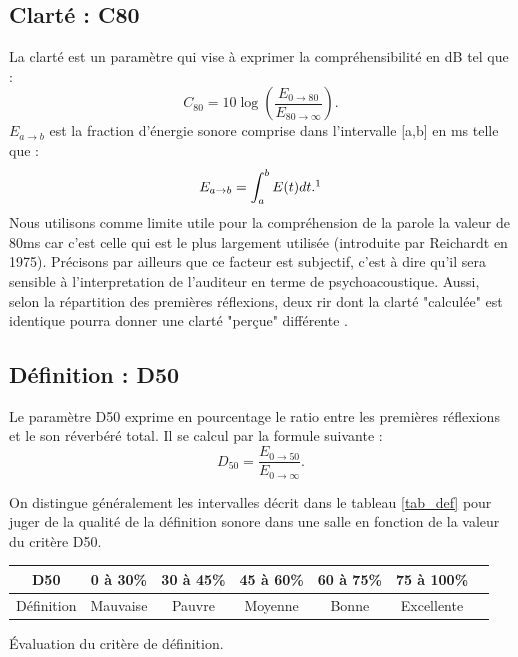 \subsection{Clarté : \gls{C80}}
La clarté est un paramètre qui vise à exprimer la compréhensibilité en dB tel que :
%
\begin{equation}
C_{80} = 10\log{\left( \frac{E_{0\to80}}{E_{80\to\infty}} \right)}.
\end{equation}
%
$E_{a\to b}$ est la fraction d'énergie sonore comprise dans l'intervalle [a,b] en ms telle que :
%
\begin{equation}
E_{a\to b} = \int_a^b E(t) dt. \footnotemark
\end{equation}
Nous utilisons comme limite utile pour la compréhension de la parole la valeur de 80ms car c'est celle qui est le plus largement utilisée (introduite par Reichardt \cite[p.126]{Reichardt} en 1975). Précisons par ailleurs que ce facteur est subjectif, c'est à dire qu'il sera sensible à l'interpretation de l'auditeur en terme de psychoacoustique. Aussi, selon la répartition des premières réflexions, deux \gls{rir} dont la clarté "calculée" est identique pourra donner une clarté "perçue" différente \cite[p. 226]{jouhaneau}. %
	
\subsection{Définition : \gls{D50}}
Le paramètre \gls{D50} exprime en pourcentage le ratio entre les premières réflexions et le son réverbéré total. Il se calcul par la formule suivante :
\begin{equation}
D_{50} = \frac{E_{0\to50}}{E_{0\to\infty}}.
\end{equation}

On distingue généralement les intervalles décrit dans le tableau \ref{tab_def} \cite[p.59]{acoustique} pour juger de la qualité de la définition sonore dans une salle en fonction de la valeur du critère \gls{D50}. 

\begin{tableth}
	\begin{tabular}{| *{7}{c|}}
		\hline
		 \gls{D50} & 0 à 30\% & 30 à 45\%& 45 à 60\%& 60 à 75\% & 75 à 100\%\\
		  \hline
		   Définition & Mauvaise & Pauvre & Moyenne & Bonne & Excellente \\
		   \hline
	 \end{tabular}
	\caption{Évaluation du critère de définition.}
	 \label{tab_def}
\end{tableth}


